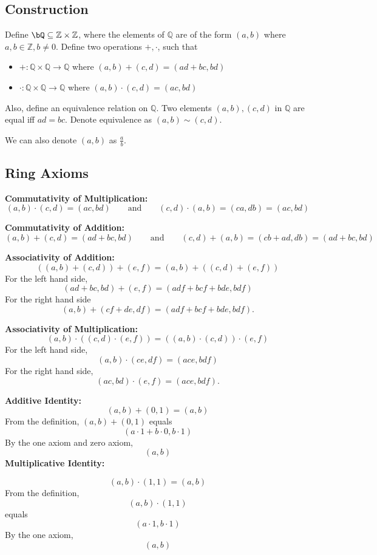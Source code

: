 \subsection{Construction}

Define $\bQ \subseteq \mathbb{Z}\times \mathbb{Z}$, where the elements of $\mathbb{Q}$ are of the form $(a,b)$ where $a,b\in\mathbb{Z}, b\neq 0$. Define two operations $+,\cdot$, such that 

\begin{itemize}
    \item $+:\mathbb{Q}\times \mathbb{Q}\rightarrow \mathbb{Q}$ where $(a,b)+(c,d)=(ad+bc,bd)$
    \item $\cdot:\mathbb{Q}\times \mathbb{Q}\rightarrow \mathbb{Q}$ where $(a,b)\cdot (c,d)=(ac,bd)$
\end{itemize}

Also, define an equivalence relation on $\mathbb{Q}$. Two elements $(a,b),(c,d)$ in $\mathbb{Q}$ are equal iff $ad=bc$. Denote equivalence as $(a,b)\sim(c,d)$.

We can also denote $(a,b)$ as $\frac{a}{b}$.

\subsection{Ring Axioms}
\textbf{Commutativity of Multiplication: } \[(a,b) \cdot (c,d) = (ac,bd) \qquad \text{and} \qquad (c,d) \cdot (a,b) = (ca, db) = (ac,bd)\]

\noindent\textbf{Commutativity of Addition: } \[(a,b)+(c,d) = (ad+bc, bd) \qquad \text{and} \qquad (c,d) + (a,b) = (cb+ad, db) = (ad+bc, bd)\]

\noindent\textbf{Associativity of Addition: } \[
((a,b) + (c,d))+(e,f) = (a,b)+((c,d)+(e,f))
\]
For the left hand side, \[   (ad+bc, bd)+(e,f) = (adf+bcf+bde, bdf)\]
For the right hand side \[(a,b) + (cf+de, df) = (adf+bcf+bde, bdf).\]



\noindent\textbf{Associativity of Multiplication: }
 \[(a,b)\cdot((c,d) \cdot(e,f)) = ((a,b) \cdot (c,d))\cdot(e,f)\]
\noindent
For the left hand side, \[(a,b)\cdot(ce,df)=(ace,bdf)\]
For the right hand side, 
\[
(ac,bd)\cdot(e,f)=(ace,bdf).
\]

\noindent\textbf{Additive Identity: }
\[
(a,b)+(0,1) = (a,b)
\]
From the definition, $(a,b)+(0,1)$ equals 
\[
(a\cdot 1+b\cdot 0, b\cdot 1)
\]
By the one axiom and zero axiom,
\[
(a,b)
\]
\noindent\textbf{Multiplicative Identity: }

\[
(a,b)\cdot(1,1) = (a,b)
\]
From the definition, $$(a,b)\cdot(1,1)$$ equals
\[
(a\cdot1,b\cdot1)
\]
By the one axiom, 
\[(a,b)\]
 
